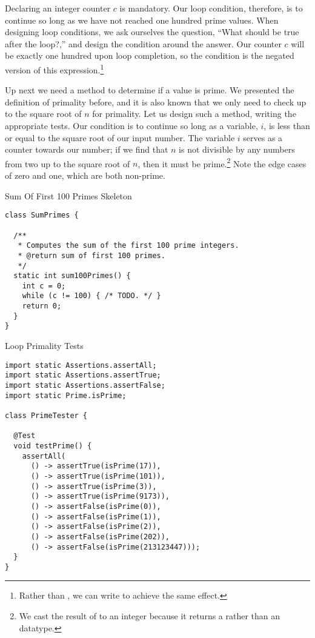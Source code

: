 Declaring an integer counter $c$ is mandatory. Our loop condition, therefore, is to continue so long as we have not reached one hundred prime values. When designing loop conditions, we ask ourselves the question, ``What should be true after the loop?,'' and design the condition around the answer. Our counter $c$ will be exactly one hundred upon loop completion, so the condition is the negated version of this expression.\footnote{Rather than , we can write  to achieve the same effect.}

Up next we need a method to determine if a value is prime. We presented the definition of primality before, and it is also known that we only need to check up to the square root of $n$ for primality. Let us design such a method, writing the appropriate tests. Our condition is to continue so long as a variable, $i$, is less than or equal to the square root of our input number. The variable $i$ serves as a counter towards our number; if we find that $n$ is not divisible by any numbers from two up to the square root of $n$, then it must be prime.\footnote{We cast the result of  to an integer because it returns a  rather than an  datatype.} Note the edge cases of zero and one, which are both non-prime.

\begin{cl}{Sum Of First 100 Primes Skeleton}
\begin{lstlisting}[language=MyJava]
class SumPrimes {

  /**
   * Computes the sum of the first 100 prime integers.
   * @return sum of first 100 primes.
   */
  static int sum100Primes() {
    int c = 0;
    while (c != 100) { /* TODO. */ }
    return 0;
  }
}
\end{lstlisting}
\end{cl}

\begin{cl}{Loop Primality Tests}
\begin{lstlisting}[language=MyJava]
import static Assertions.assertAll;
import static Assertions.assertTrue;
import static Assertions.assertFalse;
import static Prime.isPrime;

class PrimeTester {

  @Test
  void testPrime() {
    assertAll(
      () -> assertTrue(isPrime(17)),
      () -> assertTrue(isPrime(101)),
      () -> assertTrue(isPrime(3)),
      () -> assertTrue(isPrime(9173)),
      () -> assertFalse(isPrime(0)),
      () -> assertFalse(isPrime(1)),
      () -> assertFalse(isPrime(2)),
      () -> assertFalse(isPrime(202)),
      () -> assertFalse(isPrime(213123447)));
  }
}
\end{lstlisting}
\end{cl}

